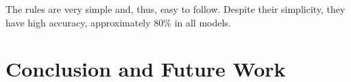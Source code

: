 The rules are very simple and, thus, easy to follow. Despite their simplicity,
they have high accuracy, approximately 80\% in all models.  

%


%
%

%
%
%
%
%
%
%

\section{Conclusion and Future Work} \label{sec:conclusion}

